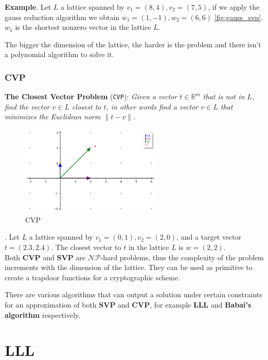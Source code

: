 \documentclass[a4paper,12pt]{report}
\newcommand{\R}{\mathbb{R}}
\begin{document}
\textbf{Example}. Let $L$ a lattice spanned by $v_1 = (8, 4), v_2 = (7, 5)$, if we apply the gauss reduction algorithm we
obtain $w_1 = (1, -1), w_2 = (6, 6)$ \ref{fig:gauss_svp}. $w_1$ is the shortest nonzero vector in the lattice $L$.

The bigger the dimension of the lattice, the harder is the problem and there isn't a polynomial algorithm to solve it.

\subsection{CVP}

\textbf{The Closest Vector Problem} (\texttt{CVP}): \textit{Given a vector $t \in \R^m$ that is not in $L$, find the vector $v \in L$
    closest to $t$, in other words find a vector $v \in L$ that minimizes the Euclidean norm $\lVert t - v \rVert$.}

\begin{figure}[!ht]
    \centering
    \includegraphics[width=0.6\textwidth]{./img/cvp.png}
    \caption{CVP}
    \label{fig:cvp}
\end{figure}

. Let $L$ a lattice spanned by $v_1 = (0, 1), v_2 = (2, 0)$, and a target vector $t = (2.3, 2.4)$. The closest vector
to $t$ in the lattice $L$ is $w = (2, 2)$.\\

Both \textbf{CVP} and \textbf{SVP} are $\mathcal{NP}$-hard problems, thus the complexity of the problem increments with the dimension
of the lattice. They can be used as primitive to create a trapdoor functions for a cryptographic scheme.

There are various algorithms that can output a solution under certain constraints for an approximation of both \textbf{SVP}
and \textbf{CVP}, for example \textbf{LLL}\cite{LLL} and \textbf{Babai's algorithm}\cite{babai} respectively.

\chapter{LLL}
\end{document}
